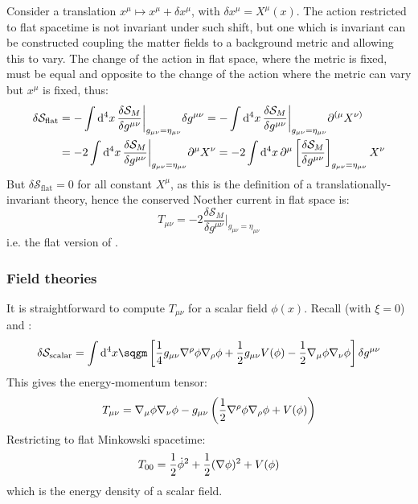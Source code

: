 Consider a translation $ x^\mu \mapsto x^\mu + \delta x^\mu $, with $ \delta x^\mu = X^\mu(x) $. The action restricted to flat spacetime is not invariant under such shift, but one which is invariant can be constructed coupling the matter fields to a background metric and allowing this to vary. The change of the action in flat space, where the metric is fixed, must be equal and opposite to the change of the action where the metric can vary but $ x^\mu $ is fixed, thus:
\begin{equation*}
  \begin{split}
    \delta \mathcal{S}_{\text{flat}}
    &= - \int \mathrm{d}^4 x\, \frac{\delta \mathcal{S}_M}{\delta g^{\mu \nu}} \bigg\vert_{g_{\mu \nu} = \eta_{\mu \nu}} \delta g^{\mu \nu} = - \int \mathrm{d}^4 x\, \frac{\delta \mathcal{S}_M}{\delta g^{\mu \nu}} \bigg\vert_{g_{\mu \nu} = \eta_{\mu \nu}} \partial^{(\mu} X^{\nu)} \\
    &= - 2 \int \mathrm{d}^4 x\, \frac{\delta \mathcal{S}_M}{\delta g^{\mu \nu}} \bigg\vert_{g_{\mu \nu} = \eta_{\mu \nu}} \partial^\mu X^\nu = - 2 \int \mathrm{d}^4 x\, \partial^\mu \left[ \frac{\delta \mathcal{S}_M}{\delta g^{\mu \nu}} \right]_{g_{\mu \nu} = \eta_{\mu \nu}} X^\nu
  \end{split}
\end{equation*}
But $ \delta \mathcal{S}_{\text{flat}} = 0 $ for all constant $ X^\mu $, as this is the definition of a translationally-invariant theory, hence the conserved Noether current in flat space is:
\begin{equation*}
  T_{\mu \nu} = - 2 \frac{\delta \mathcal{S}_M}{\delta g^{\mu \nu}} \bigg\vert_{g_{\mu \nu} = \eta_{\mu \nu}}
\end{equation*}
i.e. the flat version of .

\subsubsection{Field theories}

It is straightforward to compute $ T_{\mu \nu} $ for a scalar field $ \phi(x) $. Recall  (with $ \xi = 0 $) and :
\begin{equation*}
  \delta \mathcal{S}_{\text{scalar}} = \int \dd^4 x \sqgm \left[ \frac{1}{4} g_{\mu \nu} \na^\rho \phi \na_\rho \phi + \frac{1}{2} g_{\mu \nu} V(\phi) - \frac{1}{2} \na_\mu \phi \na_\nu \phi \right] \delta g^{\mu \nu}
\end{equation*}
This gives the energy-momentum tensor:
\begin{equation}
  T_{\mu \nu} = \nabla_\mu \phi \nabla_\nu \phi - g_{\mu \nu} \left( \frac{1}{2} \nabla^\rho \phi \nabla_\rho \phi + V(\phi) \right)
  \label{eq:em-tens-scalar}
\end{equation}
Restricting to flat Minkowski spacetime:
\begin{equation*}
  T_{00} = \frac{1}{2} \dot{\phi}^2 + \frac{1}{2} (\nabla \phi)^2 + V(\phi)
\end{equation*}
which is the energy density of a scalar field.

